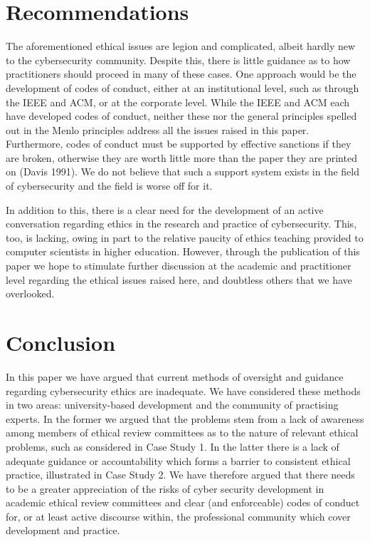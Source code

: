 \documentclass{svjour3}                     %
\begin{document}
\section{Recommendations}
\label{sec:recommendations}
The aforementioned ethical issues are legion and complicated, albeit hardly new to the cybersecurity community.  Despite this, there is little guidance as to how practitioners should proceed in many of these cases.  One approach would be the development of codes of conduct, either at an institutional level, such as through the IEEE and ACM, or at the corporate level. While the IEEE and ACM each have developed codes of conduct, neither these nor the general principles spelled out in the Menlo principles address all the issues raised in this paper.  Furthermore, codes of conduct must be supported by effective sanctions if they are broken, otherwise they are worth little more than the paper they are printed on (Davis 1991). We do not believe that such a support system exists in the field of cybersecurity and the field is worse off for it.

In addition to this, there is a clear need for the development of an active conversation regarding ethics in the research and practice of cybersecurity.  This, too, is lacking, owing in part to the relative paucity of ethics teaching provided to computer scientists in higher education.  However, through the publication of this paper we hope to stimulate further discussion at the academic and practitioner level regarding the ethical issues raised here, and doubtless others that we have overlooked.

\section{Conclusion}
\label{sec:conclusion}
In this paper we have argued that current methods of oversight and guidance regarding cybersecurity ethics are inadequate. We have considered these methods in two areas: university-based development and the community of practising experts. In the former we argued that the problems stem from a lack of awareness among members of ethical review committees as to the nature of relevant ethical problems, such as considered in Case Study 1. In the latter there is a lack of adequate guidance or accountability which forms a barrier to consistent ethical practice, illustrated in Case Study 2. We have therefore argued that there needs to be a greater appreciation of the risks of cyber security development in academic ethical review committees and clear (and enforceable) codes of conduct for, or at least active discourse within, the professional community which cover development and practice.
\end{document}
